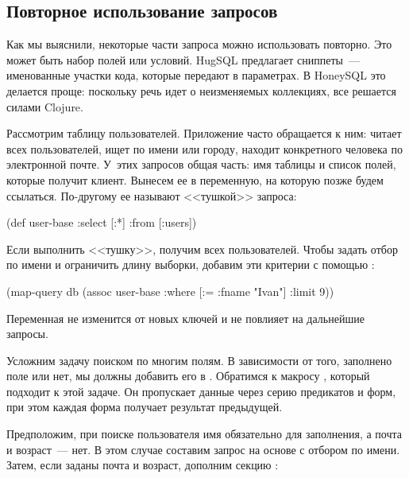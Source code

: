 \subsection{Повторное использование запросов}

Как мы выяснили, некоторые части запроса можно использовать повторно. Это может быть набор полей или условий. HugSQL предлагает сниппеты~--- именованные участки кода, которые передают в параметрах. В HoneySQL это делается проще: поскольку речь идет о неизменяемых коллекциях, все решается силами Clojure.

Рассмотрим таблицу пользователей. Приложение часто обращается к ним: читает всех пользователей, ищет по имени или городу, находит конкретного человека по электронной почте. У~этих запросов общая часть: имя таблицы и список полей, которые получит клиент. Вынесем ее в переменную, на которую позже будем ссылаться. По-другому ее называют <<тушкой>> запроса:

\begin{english}
  \begin{clojure}
(def user-base
  {:select [:*]
   :from [:users]})
  \end{clojure}
\end{english}

Если выполнить <<тушку>>, получим всех пользователей. Чтобы задать отбор по имени и ограничить длину выборки, добавим эти критерии с помощью :

\begin{english}
  \begin{clojure}
(map-query db
           (assoc user-base
                  :where [:= :fname "Ivan"]
                  :limit 9))
  \end{clojure}
\end{english}

Переменная  не изменится от новых ключей и не повлияет на дальнейшие запросы.


Усложним задачу поиском по многим полям. В зависимости от того, заполнено поле или нет, мы должны добавить его в . Обратимся к макросу , который подходит к этой задаче. Он пропускает данные через серию предикатов и форм, при этом каждая форма получает результат предыдущей.

Предположим, при поиске пользователя имя обязательно для заполнения, а почта и возраст~--- нет. В этом случае составим запрос на основе  с отбором по имени. Затем, если заданы почта и возраст, дополним секцию :

